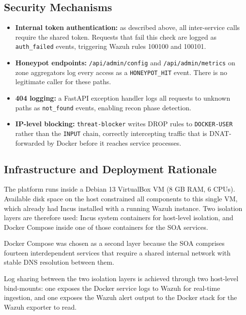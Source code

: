 \subsection{Security Mechanisms}

\begin{itemize}[leftmargin=*]
  \item \textbf{Internal token authentication:} as described above, all inter-service
        calls require the shared token. Requests that fail this check are logged as
        \texttt{auth\_failed} events, triggering Wazuh rules 100100 and 100101.
  \item \textbf{Honeypot endpoints:} \texttt{/api/admin/config} and
        \texttt{/api/admin/metrics} on zone aggregators log every access as a
        \texttt{HONEYPOT\_HIT} event. There is no legitimate caller for these paths.
  \item \textbf{404 logging:} a FastAPI exception handler logs all requests to unknown
        paths as \texttt{not\_found} events, enabling recon phase detection.
  \item \textbf{IP-level blocking:} \texttt{threat-blocker} writes DROP rules to
        \texttt{DOCKER-USER} rather than the \texttt{INPUT} chain, correctly intercepting
        traffic that is DNAT-forwarded by Docker before it reaches service processes.
\end{itemize}

\subsection{Infrastructure and Deployment Rationale}

The platform runs inside a Debian 13 VirtualBox VM (8 GB RAM, 6 CPUs). Available disk space on the host constrained all
components to this single VM, which already had Incus installed with a running Wazuh
instance. Two isolation layers are therefore used: Incus system containers for
host-level isolation, and Docker Compose inside one of those containers for the SOA
services.

Docker Compose was chosen as a second layer because the SOA comprises fourteen
interdependent services that require a shared internal network with stable DNS
resolution between them.

Log sharing between the two isolation layers is achieved through two host-level
bind-mounts: one exposes the Docker service logs to Wazuh for real-time ingestion,
and one exposes the Wazuh alert output to the Docker stack for the Wazuh exporter
to read.

